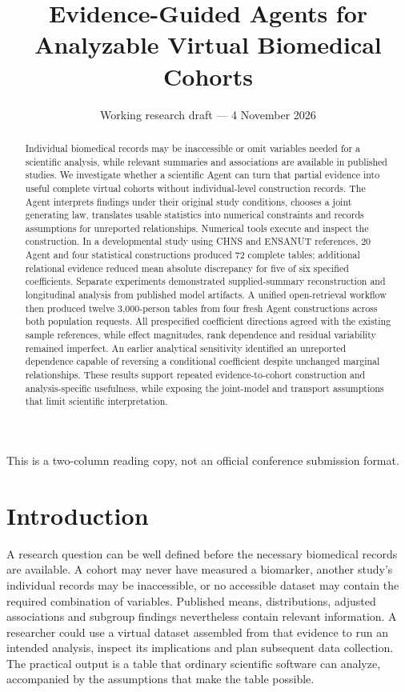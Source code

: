 \documentclass[10pt,twocolumn]{article}
\title{Evidence-Guided Agents for Analyzable Virtual Biomedical Cohorts}
\author{\small Working research draft --- 4 November 2026}
\date{}
\begin{document}
\maketitle
\begingroup\footnotesize\noindent This is a two-column reading copy, not an official conference submission format.\par\endgroup
\begin{abstract}

Individual biomedical records may be inaccessible or omit variables needed for a scientific analysis, while relevant summaries and associations are available in published studies. We investigate whether a scientific Agent can turn that partial evidence into useful complete virtual cohorts without individual-level construction records. The Agent interprets findings under their original study conditions, chooses a joint generating law, translates usable statistics into numerical constraints and records assumptions for unreported relationships. Numerical tools execute and inspect the construction. In a developmental study using CHNS and ENSANUT references, 20 Agent and four statistical constructions produced 72 complete tables; additional relational evidence reduced mean absolute discrepancy for five of six specified coefficients. Separate experiments demonstrated supplied-summary reconstruction and longitudinal analysis from published model artifacts. A unified open-retrieval workflow then produced twelve 3,000-person tables from four fresh Agent constructions across both population requests. All prespecified coefficient directions agreed with the existing sample references, while effect magnitudes, rank dependence and residual variability remained imperfect. An earlier analytical sensitivity identified an unreported dependence capable of reversing a conditional coefficient despite unchanged marginal relationships. These results support repeated evidence-to-cohort construction and analysis-specific usefulness, while exposing the joint-model and transport assumptions that limit scientific interpretation.

\end{abstract}

\section{Introduction}

A research question can be well defined before the necessary biomedical records are available. A cohort may never have measured a biomarker, another study's individual records may be inaccessible, or no accessible dataset may contain the required combination of variables. Published means, distributions, adjusted associations and subgroup findings nevertheless contain relevant information. A researcher could use a virtual dataset assembled from that evidence to run an intended analysis, inspect its implications and plan subsequent data collection. The practical output is a table that ordinary scientific software can analyze, accompanied by the assumptions that make the table possible.
\end{document}
